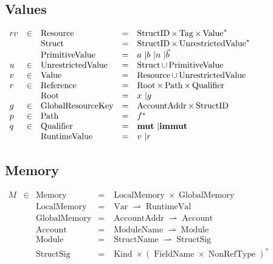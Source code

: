 \documentclass{article}
\newcommand{\tmop}[1]{\ensuremath{\operatorname{#1}}}
\newcommand{\tmstrong}[1]{\textbf{#1}}
\begin{document}
\subsection{Values}

$\begin{array}{lllll}
  r v & \in & \tmop{Resource} & = & \tmop{StructID} \times \tmop{Tag} \times
  \tmop{Value}^{\ast}\\
  &  & \tmop{Struct} & = & \tmop{StructID} \times
  \tmop{UnrestrictedValue}^{\ast}\\
  &  & \tmop{PrimitiveValue} & = & \text{$a$ \textbar $b$ \textbar $n$
  \textbar $\vec{b}$}\\
  u & \in & \tmop{UnrestrictedValue} & = & \tmop{Struct} \cup
  \tmop{PrimitiveValue}\\
  v & \in & \tmop{Value} & = & \tmop{Resource} \cup \tmop{UnrestrictedValue}\\
  r & \in & \tmop{Reference} & = & \tmop{Root} \times \tmop{Path} \times
  \tmop{Qualifier}\\
  &  & \tmop{Root} & = & \text{$x$ \textbar $g$}\\
  g & \in & \tmop{GlobalResourceKey} & = & \tmop{AccountAddr} \times
  \tmop{StructID}\\
  p & \in & \tmop{Path} & = & f^{\ast}\\
  q & \in & \tmop{Qualifier} & = & \text{{\tmstrong{mut}} \textbar
  {\tmstrong{immut}}}\\
  &  & \tmop{RuntimeValue} & = & \text{$v$ \textbar $r$}
\end{array}$

\subsection{Memory}

$\begin{array}{lllll}
  M & \in & \tmop{Memory} & = & \tmop{LocalMemory} \times
  \tmop{GlobalMemory}\\
  &  & \tmop{LocalMemory} & = & \tmop{Var} \rightharpoonup
  \tmop{RuntimeVal}\\
  &  & \tmop{GlobalMemory} & = & \tmop{AccountAddr} \rightharpoonup
  \tmop{Account}\\
  &  & \tmop{Account} & = & \tmop{ModuleName} \rightharpoonup \tmop{Module}\\
  &  & \tmop{Module} & = & \tmop{StructName} \rightharpoonup
  \tmop{StructSig}\\
  &  & \tmop{StructSig} & = & \tmop{Kind} \times (\tmop{FieldName} \times
  \tmop{NonRefType})^{\ast}
\end{array}$
\end{document}
